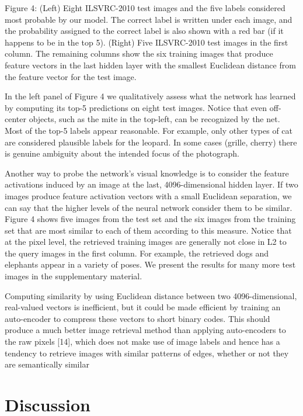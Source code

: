 \documentclass[12pt,a4paper,UTF8,twoside]{book}
\begin{document}
Figure 4: (Left) Eight ILSVRC-2010 test images and the five labels considered most probable by our model. The correct label is written under each image, and the probability assigned to the correct label is also shown with a red bar (if it happens to be in the top 5). (Right) Five ILSVRC-2010 test images in the first column. The remaining columns show the six training images that produce feature vectors in the last hidden layer with the smallest Euclidean distance from the feature vector for the test image.

In the left panel of Figure 4 we qualitatively assess what the network has learned by computing its top-5 predictions on eight test images. Notice that even off-center objects, such as the mite in the top-left, can be recognized by the net. Most of the top-5 labels appear reasonable. For example, only other types of cat are considered plausible labels for the leopard. In some cases (grille, cherry) there is genuine ambiguity about the intended focus of the photograph.

Another way to probe the network's visual knowledge is to consider the feature activations induced by an image at the last, 4096-dimensional hidden layer. If two images produce feature activation vectors with a small Euclidean separation, we can say that the higher levels of the neural network consider them to be similar. Figure 4 shows five images from the test set and the six images from the training set that are most similar to each of them according to this measure. Notice that at the pixel level, the retrieved training images are generally not close in L2 to the query images in the first column. For example, the retrieved dogs and elephants appear in a variety of poses. We present the results for many more test images in the supplementary material.

Computing similarity by using Euclidean distance between two 4096-dimensional, real-valued vectors is inefficient, but it could be made efficient by training an auto-encoder to compress these vectors to short binary codes. This should produce a much better image retrieval method than applying auto-encoders to the raw pixels {[}14{]}, which does not make use of image labels and hence has a tendency to retrieve images with similar patterns of edges, whether or not they are semantically similar

\hypertarget{discussion}{%
\section{Discussion}\label{discussion}}
\end{document}
